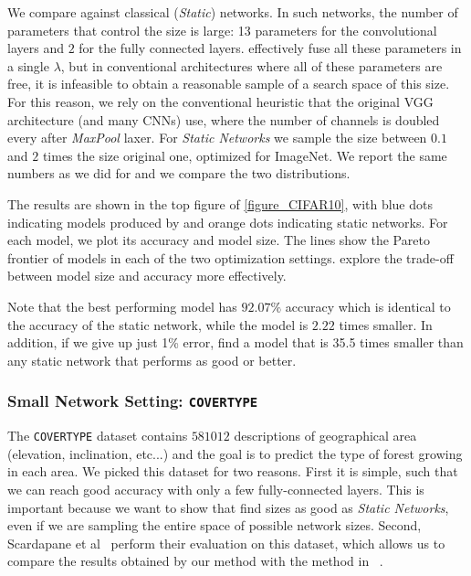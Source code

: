 We compare against classical (\textit{Static}) networks. In such networks, the
number of parameters that control the size is large: 13 parameters for the
convolutional layers and $2$ for the fully connected layers. \shrink
effectively fuse all these parameters in a single $\lambda$, but in conventional
architectures where all of these parameters are free, it is infeasible to obtain
a reasonable sample of a search space of this size. For this reason, we rely on
the conventional heuristic that the original VGG architecture (and many CNNs)
use, where the number of channels is doubled every after \textit{MaxPool} laxer.
For \textit{Static Networks} we sample the size between $0.1$ and $2$ times the size
original one, optimized for ImageNet. We report the same numbers as we did for
\shrink and we compare the two distributions. 

The results are shown in the top figure of \cref{figure_CIFAR10}, with blue dots
indicating models produced by \shrink and orange dots indicating static networks. 
For each
model, we plot its accuracy and model size. The lines show the Pareto frontier
of models in each of the two optimization settings. \shrink explore the
trade-off between model size and accuracy more effectively. 

Note that the best performing \shrink model has $92.07\%$ accuracy which
is identical to the accuracy of the static network, while the \shrink model
is $2.22$ times smaller. In addition, if we give up just 1\% error, \shrink
find a model that is 35.5 times smaller than any static network that performs
as good or better.

\subsubsection{Small Network Setting: \texttt{COVERTYPE}}

The \texttt{COVERTYPE} \cite{Blackard:1998:CNN:928509} dataset contains $581012$
descriptions of geographical area (elevation, inclination, etc...) and the goal
is to predict the type of forest growing in each area. We picked this dataset
for two reasons. First it is simple, such that we can reach good accuracy with
only a few fully-connected layers. This is important because we want to show
that \shrink find sizes as good as \textit{Static Networks}, even if
we are sampling the entire space of possible network sizes. Second, Scardapane
et al~\cite{Scardapane2017} perform their evaluation on this dataset, which
allows us to compare the results obtained by our method with the method in
~\cite{Scardapane2017}.

